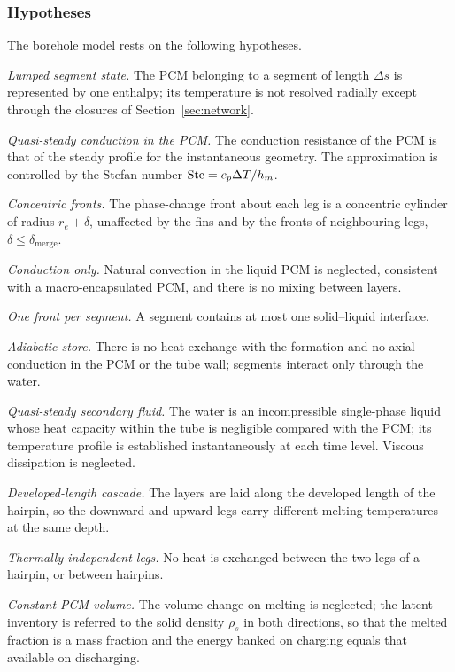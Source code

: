 \subsubsection{Hypotheses}
\label{sec:hypotheses}

The borehole model rests on the following hypotheses.

\begin{description}[leftmargin=2.2em,itemsep=2pt,font=\normalfont\bfseries]
\item[H1] \emph{Lumped segment state.} The PCM belonging to a segment of
  length $\Delta s$ is represented by one enthalpy; its temperature is not
  resolved radially except through the closures of
  Section~\ref{sec:network}.
\item[H2] \emph{Quasi-steady conduction in the PCM.} The conduction
  resistance of the PCM is that of the steady profile for the instantaneous
  geometry. The approximation is controlled by the Stefan number
  $\mathrm{Ste}=c_{p}\Delta T/h_{m}$.
\item[H3] \emph{Concentric fronts.} The phase-change front about each leg is a
  concentric cylinder of radius $r_e+\delta$, unaffected by the fins and by
  the fronts of neighbouring legs, $\delta\le\delta_\mathrm{merge}$.
\item[H4] \emph{Conduction only.} Natural convection in the liquid PCM is
  neglected, consistent with a macro-encapsulated PCM, and there is no mixing
  between layers.
\item[H5] \emph{One front per segment.} A segment contains at most one
  solid--liquid interface.
\item[H6] \emph{Adiabatic store.} There is no heat exchange with the
  formation and no axial conduction in the PCM or the tube wall; segments
  interact only through the water.
\item[H7] \emph{Quasi-steady secondary fluid.} The water is an incompressible
  single-phase liquid whose heat capacity within the tube is negligible
  compared with the PCM; its temperature profile is established
  instantaneously at each time level. Viscous dissipation is neglected.
\item[H8] \emph{Developed-length cascade.} The layers are laid along the
  developed length of the hairpin, so the downward and upward legs carry
  different melting temperatures at the same depth.
\item[H9] \emph{Thermally independent legs.} No heat is exchanged between the
  two legs of a hairpin, or between hairpins.
\item[H10] \emph{Constant PCM volume.} The volume change on melting is
  neglected; the latent inventory is referred to the solid density $\rho_s$
  in both directions, so that the melted fraction is a mass fraction and the
  energy banked on charging equals that available on discharging.
\end{description}

